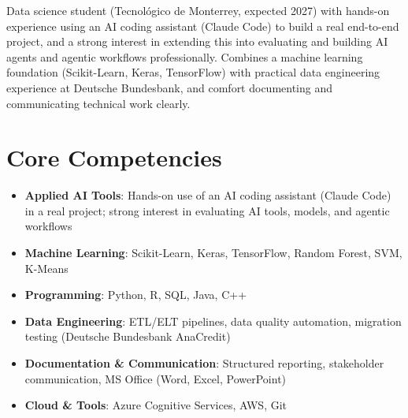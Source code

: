 \documentclass[11pt,a4paper,sans]{moderncv}
\begin{document}
\makecvtitle


\vspace{6pt}
\small{Data science student (Tecnológico de Monterrey, expected 2027) with hands-on experience using an AI coding assistant (Claude Code) to build a real end-to-end project, and a strong interest in extending this into evaluating and building AI agents and agentic workflows professionally. Combines a machine learning foundation (Scikit-Learn, Keras, TensorFlow) with practical data engineering experience at Deutsche Bundesbank, and comfort documenting and communicating technical work clearly.}


\section{Core Competencies}
\vspace{1pt}
\begin{itemize}

\item \textbf{Applied AI Tools}: Hands-on use of an AI coding assistant (Claude Code) in a real project; strong interest in evaluating AI tools, models, and agentic workflows

\item \textbf{Machine Learning}: Scikit-Learn, Keras, TensorFlow, Random Forest, SVM, K-Means

\item \textbf{Programming}: Python, R, SQL, Java, C++

\item \textbf{Data Engineering}: ETL/ELT pipelines, data quality automation, migration testing (Deutsche Bundesbank AnaCredit)

\item \textbf{Documentation \& Communication}: Structured reporting, stakeholder communication, MS Office (Word, Excel, PowerPoint)

\item \textbf{Cloud \& Tools}: Azure Cognitive Services, AWS, Git

\end{itemize}

\end{document}
